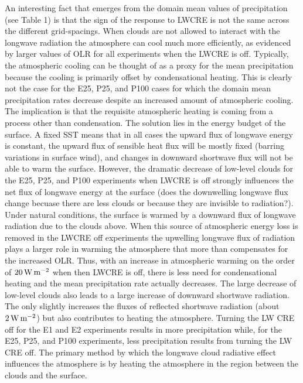 \documentclass[11pt]{article}   	%
\begin{document}
An interesting fact that emerges from the domain mean values of precipitation (see Table 1) 
is that the sign of the response to LWCRE is not the same across the different grid-spacings.
When clouds are not allowed to interact with the longwave radiation the atmosphere can cool 
much more efficiently, as evidenced by larger values of OLR for all experiments when the LWCRE is
off.  Typically, the atmospheric cooling can be thought of as a proxy for the mean precipitation 
because the cooling is primarily offset by condensational heating.  This is clearly not the case 
for the E25, P25, and P100 cases for which the domain mean precipitation rates decrease despite
an increased amount of atmospheric cooling.  The implication is that the requisite atmospheric 
heating is coming from a process other than condensation.  The solution lies in the energy 
budget of the surface.  A fixed SST means that in all cases the upward flux of longwave energy
is constant, the upward flux of sensible heat flux will be mostly fixed (barring variations in surface
wind), and changes in downward shortwave flux will not be able to warm the surface.  However, 
the dramatic decrease of low-level clouds for the E25, P25, and P100 experiments when LWCRE is
off strongly influences the net flux of longwave energy at the surface (does the downwelling longwave
flux change becuase there are less clouds or because they are invisible to radiation?).  Under 
natural conditions, the surface is warmed by a downward flux of longwave radiation due to the clouds
above.  When this source of atmospheric energy loss is removed in the LWCRE off experiments 
the upwelling longwave flux of radiation plays a larger role in warming the atmosphere that more 
than compensates for the increased OLR.  Thus, with an increase in atmospheric warming on 
the order of $20 \, \rm{W \,m^{-2}}$ when then LWCRE is off, there is less need for condensational heating and the 
mean precipitation rate actually decreases.  The large decrease of low-level clouds also 
leads to a large increase of downward shortwave radiation.  The only slightly increases the
fluxes of reflected shortwave radiation (about $2 \, \rm{W \,m^{-2}}$) but also contributes to 
heating the atmosphere.
Turning the LW CRE off for the E1 and E2 experiments results in more precipitation while, 
for the E25, P25, and P100 
experiments, less precipitation results from turning the LW CRE off.  
The primary method by which the longwave cloud 
radiative effect influences the atmosphere is by heating the atmosphere in the region between the clouds and the surface.  
\end{document}
